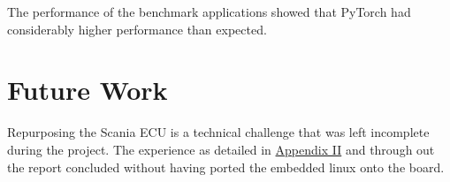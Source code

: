 The performance of the benchmark applications showed that PyTorch had considerably higher performance than expected.


\section{Future Work}

Repurposing the Scania ECU is a technical challenge that was left incomplete during the project. The experience as detailed in \hyperref[rtc-c300]{Appendix II} and through out the report concluded without having ported the embedded linux onto the board.
